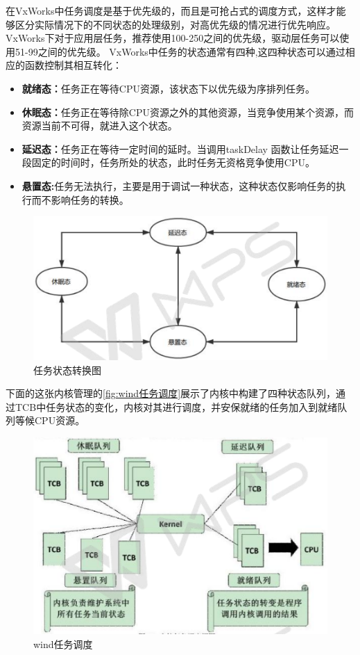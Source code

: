 	
	
	在VxWorks中任务调度是基于优先级的，而且是可抢占式的调度方式，这样才能够区分实际情况下的不同状态的处理级别，对高优先级的情况进行优先响应。	VxWorks下对于应用层任务，推荐使用100-250之间的优先级，驱动层任务可以使用51-99之间的优先级。
	VxWorks中任务的状态通常有四种,这四种状态可以通过相应的函数控制其相互转化：
\begin{itemize}
\item \textbf{就绪态：}任务正在等待CPU资源，该状态下以优先级为序排列任务。
\item \textbf{休眠态：}任务正在等待除CPU资源之外的其他资源，当竞争使用某个资源，而资源当前不可得，就进入这个状态。
\item \textbf{延迟态：}任务正在等待一定时间的延时。当调用taskDelay 函数让任务延迟一段固定的时间时，任务所处的状态，此时任务无资格竞争使用CPU。
\item \textbf{悬置态:}任务无法执行，主要是用于调试一种状态，这种状态仅影响任务的执行而不影响任务的转换。
\end{itemize}

\begin{figure}[!h]
\centering
\includegraphics[width=.9\textwidth]{./graphics/vxworks-task-shift-diagram.pdf}
\caption{任务状态转换图}\label{fig:VxWorks状态转换图}
\end{figure}

	下面的这张内核管理的\autoref{fig:wind任务调度}展示了内核中构建了四种状态队列，通过TCB中任务状态的变化，内核对其进行调度，并安保就绪的任务加入到就绪队列等候CPU资源。

\begin{figure}[!h]
\centering
\includegraphics[width=.9\textwidth]{./graphics/vxworks-task-scheduling-diagram.pdf}
\caption{wind任务调度}\label{fig:wind任务调度}
\end{figure}


